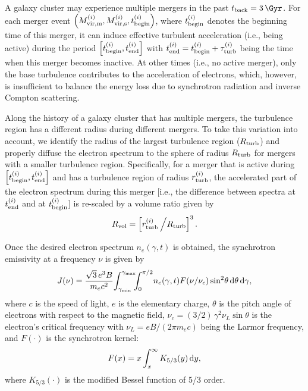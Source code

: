 A galaxy cluster may experience multiple mergers in the past
$t_{\R{back}} = \SI{3}{\Gyr}$.
For each merger event
$\left( M^{(i)}_{\mathrm{vir,m}}, M^{(i)}_{\mathrm{vir,s}}, t^{(i)}_{\mathrm{begin}} \right)$,
where $t^{(i)}_{\mathrm{begin}}$ denotes the beginning time of this merger,
it can induce effective turbulent acceleration (i.e., being active) during
the period $\left[ t^{(i)}_{\mathrm{begin}}, t^{(i)}_{\mathrm{end}} \right]$ with
$t^{(i)}_{\mathrm{end}} = t^{(i)}_{\mathrm{begin}}+\tau^{(i)}_{\mathrm{turb}}$ being the
time when this merger becomes inactive.
At other times (i.e., no active merger), only the base turbulence
contributes to the acceleration of electrons, which, however,
is insufficient to balance the energy loss due to synchrotron radiation
and inverse Compton scattering.

Along the history of a galaxy cluster that has multiple mergers, the
turbulence region has a different radius during different mergers.
To take this variation into account, we identify the radius of the largest
turbulence region ($R_{\mathrm{turb}}$) and properly diffuse the electron
spectrum to the sphere of radius $R_{\mathrm{turb}}$ for mergers with a smaller
turbulence region.
Specifically, for a merger that is active during 
$\left[ t^{(i)}_{\mathrm{begin}}, t^{(i)}_{\mathrm{end}} \right]$ and has a
turbulence region of radius $r^{(i)}_{\mathrm{turb}}$, the accelerated part of
the electron spectrum during this merger [i.e., the difference between
spectra at $t^{(i)}_{\mathrm{end}}$ and at $t^{(i)}_{\mathrm{begin}}$] is re-scaled
by a volume ratio given by
\begin{equation}
  \label{eq:ratio-v}
  R_{\mathrm{vol}} = \left[ r^{(i)}_{\mathrm{turb}} \,\Big/ R_{\mathrm{turb}} \right]^3 .
\end{equation}

Once the desired electron spectrum $n_e(\gamma, t)$ is obtained, the
synchrotron emissivity at a frequency $\nu$ is given by \cite{rybicki1979}
\begin{equation}
  \label{sec:jnu-sync}
  J(\nu) = \frac{\sqrt{3} \, e^3 B}{m_e c^2}
    \!\int_{\gamma_{\mathrm{min}}}^{\gamma_{\mathrm{max}}} \!\!\!\int_0^{\pi/2}\!
    n_e(\gamma, t) F(\nu/\nu_c) \sin^2 \!\theta \,\mathrm{d}\theta \,\mathrm{d}\gamma,
\end{equation}
where
$c$ is the speed of light,
$e$ is the elementary charge,
$\theta$ is the pitch angle of electrons with respect to the magnetic
field, $\nu_c = (3/2) \,\gamma^2 \nu_L \sin\theta$ is the electron's
critical frequency with $\nu_L = e B / (2\pi m_e c)$ being the Larmor
frequency, and $F(\cdot)$ is the synchrotron kernel:
\begin{equation}
  \label{eq:sync-kernel}
  F(x) = x \int_x^{\infty} K_{5/3}(y) \,\mathrm{d}y ,
\end{equation}
where $K_{5/3}(\cdot)$ is the modified Bessel function of 5/3 order.

